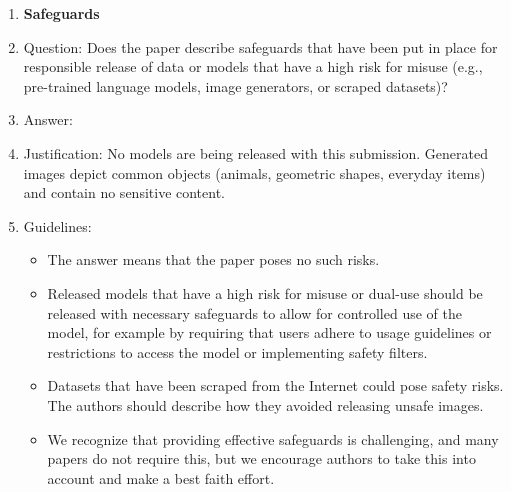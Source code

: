 \documentclass{article}
\begin{document}
\begin{enumerate}
\item {\bf Safeguards}
    \item[] Question: Does the paper describe safeguards that have been put in place for responsible release of data or models that have a high risk for misuse (e.g., pre-trained language models, image generators, or scraped datasets)?
    \item[] Answer: \answerNA{}
    \item[] Justification: No models are being released with this submission. Generated images depict common objects (animals, geometric shapes, everyday items) and contain no sensitive content.
    \item[] Guidelines:
    \begin{itemize}
        \item The answer \answerNA{} means that the paper poses no such risks.
        \item Released models that have a high risk for misuse or dual-use should be released with necessary safeguards to allow for controlled use of the model, for example by requiring that users adhere to usage guidelines or restrictions to access the model or implementing safety filters.
        \item Datasets that have been scraped from the Internet could pose safety risks. The authors should describe how they avoided releasing unsafe images.
        \item We recognize that providing effective safeguards is challenging, and many papers do not require this, but we encourage authors to take this into account and make a best faith effort.
    \end{itemize}


\end{enumerate}
\end{document}
